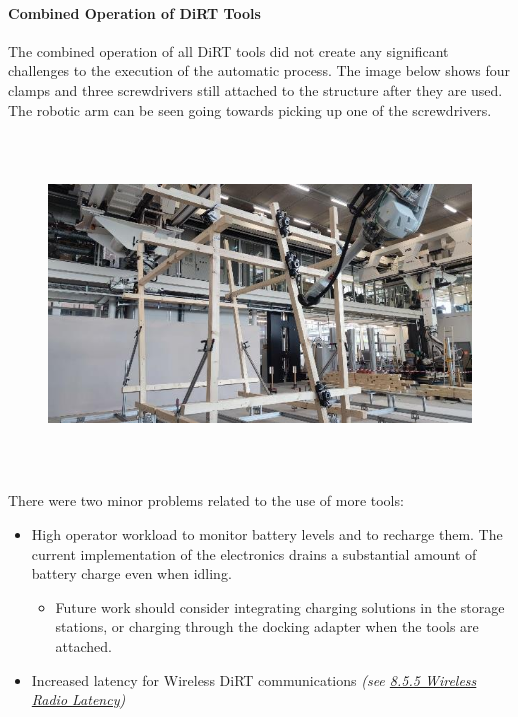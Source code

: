 \documentclass[11pt]{book}
\begin{document}
\paragraph{Combined Operation of DiRT Tools}

The combined operation of all DiRT tools did not create any significant challenges to the execution of the automatic process. The image below shows four clamps and three screwdrivers still attached to the structure after they are used. The robotic arm can be seen going towards picking up one of the screwdrivers.

\begin{figure}[H]
\includegraphics[width=15.92cm,height=8.96cm]{./images/image34.jpeg}
\end{figure}


There were two minor problems related to the use of more tools:

\begin{itemize}
	\item High operator workload to monitor battery levels and to recharge them. The current implementation of the electronics drains a substantial amount of battery charge even when idling.

\begin{itemize}
	\item Future work should consider integrating charging solutions in the storage stations, or charging through the docking adapter when the tools are attached.

\end{itemize}
	\item Increased latency for Wireless DiRT communications\textit{ (see \uline{8.5.5 Wireless Radio Latency})}

\end{itemize}
\end{document}
